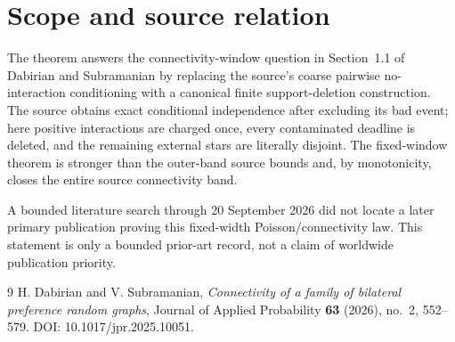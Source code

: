 \documentclass[11pt]{article}
\newcommand{\1}{\mathbf 1}
\begin{document}
\section{Scope and source relation}

The theorem answers the connectivity-window question in Section~1.1 of Dabirian and
Subramanian by replacing the source's coarse pairwise no-interaction conditioning with a
canonical finite support-deletion construction.  The source obtains exact conditional
independence after excluding its bad event; here positive interactions are charged once,
every contaminated deadline is deleted, and the remaining external stars are literally
disjoint.  The fixed-window theorem is stronger than the outer-band source bounds and,
by monotonicity, closes the entire source connectivity band.

A bounded literature search through 20 September 2026 did not locate a later primary
publication proving this fixed-width Poisson/connectivity law.  This statement is only a
bounded prior-art record, not a claim of worldwide publication priority.

\begin{thebibliography}{9}
H. Dabirian and V. Subramanian,
\emph{Connectivity of a family of bilateral preference random graphs},
Journal of Applied Probability \textbf{63} (2026), no.~2, 552--579.
DOI: 10.1017/jpr.2025.10051.
\end{thebibliography}
\end{document}

